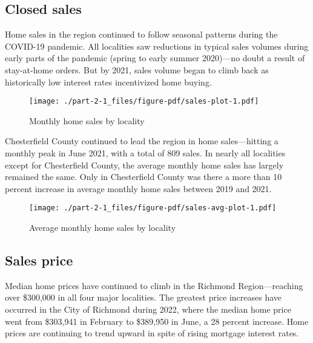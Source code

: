 \documentclass[
  letterpaper,
  DIV=11,
  numbers=noendperiod]{scrreprt}
\begin{document}
\hypertarget{closed-sales}{%
\subsection{Closed sales}\label{closed-sales}}

Home sales in the region continued to follow seasonal patterns during
the COVID-19 pandemic. All localities saw reductions in typical sales
volumes during early parts of the pandemic (spring to early summer
2020)---no doubt a result of stay-at-home orders. But by 2021, sales
volume began to climb back as historically low interest rates
incentivized home buying.

\begin{figure}

{\centering \texttt{[image: ./part-2-1\_files/figure-pdf/sales-plot-1.pdf]}

}

\caption{Monthly home sales by locality}

\end{figure}

Chesterfield County continued to lead the region in home sales---hitting
a monthly peak in June 2021, with a total of 809 sales. In nearly all
localities except for Chesterfield County, the average monthly home
sales has largely remained the same. Only in Chesterfield County was
there a more than 10 percent increase in average monthly home sales
between 2019 and 2021.

\begin{figure}

{\centering \texttt{[image: ./part-2-1\_files/figure-pdf/sales-avg-plot-1.pdf]}

}

\caption{Average monthly home sales by locality}

\end{figure}

\hypertarget{sales-price}{%
\subsection{Sales price}\label{sales-price}}

Median home prices have continued to climb in the Richmond
Region---reaching over \$300,000 in all four major localities. The
greatest price increases have occurred in the City of Richmond during
2022, where the median home price went from \$303,941 in February to
\$389,950 in June, a 28 percent increase. Home prices are continuing to
trend upward in spite of rising mortgage interest rates.
\end{document}
